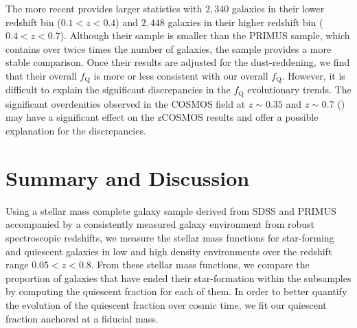 The more recent \cite{Kovac:2014aa} provides larger statistics with
$2,340$ galaxies in their lower redshift bin ($0.1 < z < 0.4$) and
$2,448$ galaxies in their higher redshift bin ($0.4 < z <
0.7$). Although their sample is smaller than the PRIMUS sample, which
contains over twice times the number of galaxies, the
\cite{Kovac:2014aa} sample provides a more stable comparison.  Once
their results are adjusted for the dust-reddening, we
find that their overall $f_{\mathrm{Q}}$ is more or less consistent with
our overall $f_{\mathrm{Q}}$. However, it is difficult to explain the
significant discrepancies in the $f_{\mathrm{Q}}$ evolutionary trends.
The significant overdenities observed in the COSMOS field at $z \sim 0.35$ and $z \sim 0.7$ (\citealt{Lilly:2009aa, Kovac:2010ab}) may have a significant effect on the zCOSMOS results and offer a possible explanation for the discrepancies. 

\section{Summary and Discussion} \label{sec:summary}
Using a stellar mass complete galaxy sample derived from SDSS and
PRIMUS accompanied by a consistently measured galaxy environment from
robust spectroscopic redshifts, we measure the stellar mass functions
for star-forming and quiescent galaxies in low and high density
environments over the redshift range $0.05 < z < 0.8$. From these
stellar mass functions, we compare the proportion of galaxies that
have ended their star-formation within the subsamples by computing the
quiescent fraction for each of them. In order to better quantify the
evolution of the quiescent fraction over cosmic time, we fit our
quiescent fraction anchored at a fiducial mass. 

